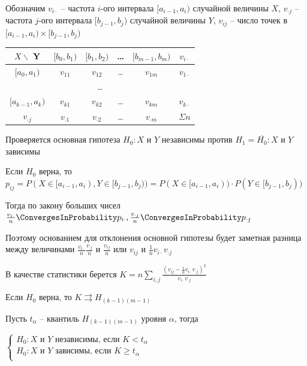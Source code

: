 \begin{enumerate}
    Обозначим $v_{i\cdot}$ -- частота $i$-ого интервала $[a_{i - 1}, a_i)$ случайной величины $X$, 
    $v_{\cdot j}$ -- частота $j$-ого интервала $[b_{j - 1}, b_j)$ случайной величины $Y$, $v_{ij}$ -- число точек в $[a_{i - 1}, a_i) \times [b_{j - 1}, b_j)$


    \begin{tabular}{c|c|c|c|c|c}
        $X\backslash$ Y & $[b_0, b_1)$ & $[b_1, b_2)$ & \dots & $[b_{m - 1}, b_m)$ & $v_{i\cdot}$ \\
        \hline
        $[a_0, a_1)$ & $v_{11}$ & $v_{12}$ & \dots & $v_{1m}$ & $v_{1\cdot}$ \\
        \hline
        \multicolumn{6}{c}{\dots} \\
        \hline
        $[a_{k - 1}, a_k)$ & $v_{k1}$ & $v_{k2}$ & \dots & $v_{km}$ & $v_{k\cdot}$ \\
        \hline
        $v_{\cdot j}$ & $v_{\cdot 1}$ & $v_{\cdot 2}$ & \dots & $v_{\cdot m}$ & $\Sigma n$ \\
    \end{tabular}

    Проверяется основная гипотеза $H_0 : X \text{ и } Y$ независимы против $H_1 = \overline{H_0} : X \text{ и } Y$ зависимы

    Если $H_0$ верна, то $p_{ij} = P(X \in [a_{i - 1}, a_i), Y \in [b_{j - 1}, b_j)) = P(X \in [a_{i - 1}, a_i)) \cdot P(Y \in [b_{j - 1}, b_j))$

    Тогда по закону больших чисел $\frac{v_{i\cdot}}{n} \ConvergesInProbability p_{i\cdot}, \frac{v_{\cdot j}}{n} \ConvergesInProbability p_{\cdot j}$

    Поэтому основанием для отклонения основной гипотезы будет заметная разница между величинами $\frac{v_{i\cdot}}{n}\frac{v_{\cdot j}}{n}$ и 
    $\frac{v_{ij}}{n}$ или $v_{ij}$ и $\frac{1}{n} v_{i\cdot} v_{\cdot j}$

    В качестве статистики берется $K = n \sum_{i, j} \frac{\left(v_{ij} - \frac{1}{n} v_{i\cdot} v_{\cdot j}\right)^2}{v_{i\cdot} v_{\cdot j}}$

    \begin{MyTheorem}
        \Ths Если $H_0$ верна, то $K \rightrightarrows H_{(k - 1)(m - 1)}$
    \end{MyTheorem}

    Пусть $t_\alpha$ -- квантиль $H_{(k - 1)(m - 1)}$ уровня $\alpha$, тогда 

    $\begin{cases}
        H_0 : X \text{ и } Y \text{ независимы, если } K < t_\alpha \\
        H_0 : X \text{ и } Y \text{ зависимы, если } K \geq t_\alpha \\
    \end{cases}$


\end{enumerate}
